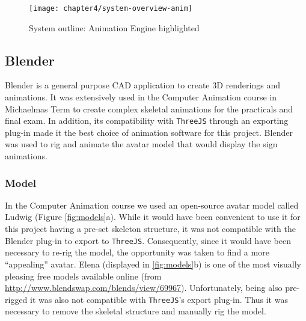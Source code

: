 \documentclass[12pt]{ociamthesis}  %
\newcommand{\tech}{\texttt}
\begin{document}
\begin{figure}[H]
	\centering
    \texttt{[image: chapter4/system-overview-anim]}
    \caption{System outline: Animation Engine highlighted}
    \label{fig:sys-over-anim}
\end{figure}	

\subsection{Blender}
Blender is a general purpose CAD application to create 3D renderings and animations. It was extensively used in the Computer Animation course in Michaelmas Term to create complex skeletal animations for the practicals and final exam. In addition, its compatibility with \tech{ThreeJS} through an exporting plug-in made it the best choice of animation software for this project. Blender was used to rig and animate the avatar model that would display the sign animations. 

\subsubsection{Model}
In the Computer Animation course we used an open-source avatar model called Ludwig (Figure \ref{fig:models}a). While it would have been convenient to use it for this project having a pre-set skeleton structure, it was not compatible with the Blender plug-in to export to  \tech{ThreeJS}. Consequently, since it would have been necessary to re-rig the model, the opportunity was taken to find a more ``appealing'' avatar. Elena (displayed in \ref{fig:models}b) is one of the most visually pleasing free models available online (from \url{http://www.blendswap.com/blends/view/69967}). Unfortunately, being also pre-rigged it was also not compatible with \tech{ThreeJS}'s export plug-in. Thus it was necessary to remove the skeletal structure and manually rig the model.
\end{document}

